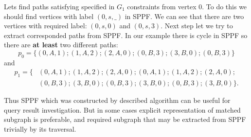 Lets find paths satisfying specified in $G_1$ constraints from vertex $0$.
To do this we should find vertices with label $(0, s, \_)$ in SPPF.
We can see that there are two vertices with required label: $(0, s, 0)$ and $(0, s, 3)$.
Next step let we try to extract corresponded paths from SPPF.
In our example there is cycle in SPPF so there are \textbf{at least} two different paths: $$p_0=\{(0,A,1);(1,A,2);(2,A,0);(0,B,3);(3,B,0);(0,B,3)\}$$ and 
\begin{align*}
p_1=\{&(0,A,1);(1,A,2);(2,A,0);(0,A,1);(1,A,2);(2,A,0);\\ &(0,B,3);(3,B,0);(0,B,3);(3,B,0);(0,B,3);(3,B,0)\}.
\end{align*}


Thus SPPF which was constructed by described algorithm can be useful for query result investigation. 
But in some cases explicit representation of matched subgraph is preferable, and required subgraph that may be extracted from SPPF trivially by its traversal.
